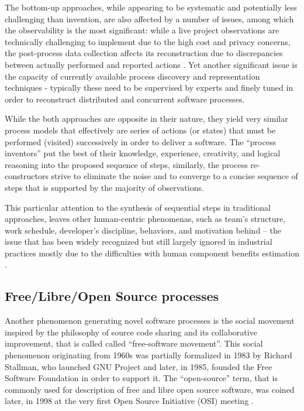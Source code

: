 The bottom-up approaches, while appearing to be systematic and potentially less challenging than invention, 
are also affected by a number of issues, among which the observability is the most significant: 
while a live project observations are technically challenging to implement due to the high cost and 
privacy concerns, the post-process data collection affects its reconstruction due to 
discrepancies between actually performed and reported actions \cite{citeulike:7691059}. 
Yet another significant issue is the capacity of currently available process discovery and representation 
techniques - typically these need to be supervised by experts and finely tuned in order to reconstruct 
distributed and concurrent software processes. 

While the both approaches are opposite in their nature, they yield very similar process models that 
effectively are series of actions (or states) that must be performed (visited) successively in order 
to deliver a software. The ``process inventors'' put the best of their knowledge, experience, creativity,
and logical reasoning into the proposed sequence of steps, similarly, the process re-constructors 
strive to eliminate the noise and to converge to a concise sequence of steps that is supported by the 
majority of observations. 

This particular attention to the synthesis of sequential steps in traditional approaches, 
leaves other human-centric phenomenas, such as team's structure, work schedule, 
developer's discipline, behaviors, and motivation behind -- 
the issue that has been widely recognized \cite{citeulike:149387} \cite{citeulike:113403} 
\cite{citeulike:205322} \cite{citeulike:12798652} but still largely ignored in industrial practices 
mostly due to the  difficulties with human component benefits estimation 
\cite{citeulike:12798659} \cite{citeulike:12798662} \cite{csdl2-12-11}.

%
%
\subsection{Free/Libre/Open Source processes}\label{sec_floss_processes}
Another phenomenon generating novel software processes is the social movement inspired by the philosophy 
of source code sharing and its collaborative improvement, that is called called ``free-software movement''. 
This social phenomenon originating from 1960s was partially formalized in 1983 by Richard Stallman,
who launched GNU Project and later, in 1985, founded the Free Software Foundation in order to support 
it. The ``open-source'' term, that is commonly used for description of free and libre open source software, 
was coined later, in 1998 at the very first Open Source Initiative (OSI) meeting \cite{osi-history}.

